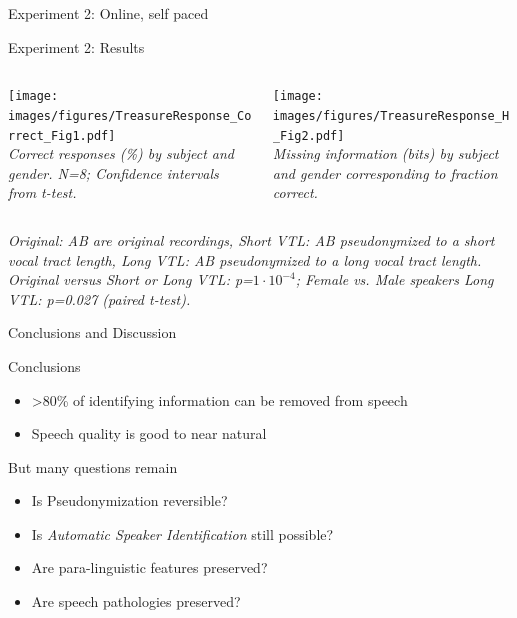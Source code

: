 \documentclass[xcolor={dvipsnames}]{beamer}
\begin{document}
\begin{frame}{Experiment 2: Online, self paced}
\let\thefootnote\relax{}
\end{frame}

\begin{frame}{Experiment 2: Results}
    \begin{columns}
        \centering
        \begin{column}{0.48\textwidth}
        \texttt{[image: images/figures/TreasureResponse\_Correct\_Fig1.pdf]} \\
        \scriptsize{\textit{Correct responses (\%) by subject and gender.
        N=8; Confidence intervals from t-test.}}
        \end{column}
        \begin{column}{0.48\textwidth}
        \texttt{[image: images/figures/TreasureResponse\_H\_Fig2.pdf]}\\
        \scriptsize{\textit{Missing information (bits) by subject and gender corresponding to fraction correct.}}

        \end{column}
    \end{columns}
    \vskip 0.8cm
    \scriptsize{\textit{Original: AB are original recordings, Short VTL: AB pseudonymized to a short vocal tract length, Long VTL: AB pseudonymized to a long vocal tract length.\\
    Original versus Short or Long VTL: p=$1\cdot 10^{-4}$; Female vs. Male speakers Long VTL: p=0.027 (paired t-test).}}
\end{frame}

\begin{frame}{Conclusions and Discussion}

\begin{block}{Conclusions}
\begin{itemize}
    \item >80\% of identifying information can be removed from speech
    \item Speech quality is good to near natural
\end{itemize}
\end{block}
 \begin{block}{But many questions remain}
\begin{itemize}
    \item Is Pseudonymization reversible?
    \item Is {\em Automatic Speaker Identification} still possible?
    \item Are para-linguistic features preserved?
    \item Are speech pathologies preserved?
\end{itemize}
\end{block}

\end{frame}
\end{document}
